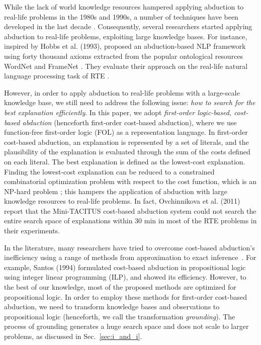 \documentclass[english]{jnlp_1.4}
\begin{document}
While the lack of world knowledge resources hampered applying
abduction to real-life problems in the 1980s and 1990s, a number of
techniques have been developed
in the last decade
\cite{fellbaum98,Chambers09,framenetII,Scho10,Hovy11}.
Consequently, several researchers started applying abduction to
real-life problems, exploiting large knowledge bases. For instance,
inspired by Hobbs et al. (1993)\nocite{Hobbs93}, 
     proposed an abduction-based NLP framework using forty
thousand axioms extracted from the popular ontological resources WordNet \cite{fellbaum98} and
FrameNet \cite{framenetII}. They evaluate their approach on the
real-life natural language processing task of RTE \cite{Dagan10}.

However, in order to apply abduction to real-life problems with
a large-scale knowledge base, we still need to address the following
issue: \emph{how to search for the best explanation efficiently}. In
this paper, we adopt \emph{first-order logic-based, cost-based
  abduction} (henceforth first-order cost-based abduction), where we
use function-free first-order logic (FOL) as a representation
language. In first-order cost-based abduction, an explanation is
represented by a set of literals, and the plausibility of the explanation
is evaluated through the sum of the costs defined on each literal. The
best explanation is defined as the lowest-cost explanation. Finding
the lowest-cost explanation can be reduced to a constrained
combinatorial optimization problem with respect to the cost function,
which is an NP-hard problem \cite{Charniak91}; this hampers the
application of abduction with large knowledge resources to real-life
problems. In fact, Ovchinnikova et al. (2011) \nocite{Ovch11} report
that the Mini-TACITUS cost-based abduction system \cite{Mulkar07}
could not search the entire search space of explanations within 30
min in most of the RTE problems in their experiments.

In the
literature, many researchers have tried to overcome cost-based
abduction's inefficiency using a range of methods from approximation to
exact
inference~\cite{Poole93b,Santos94,Ishizuka98,Chivers07}. For
example, Santos (1994) formulated cost-based abduction in propositional
logic using integer linear programming (ILP), and showed its
efficiency. However, to the best of our knowledge, most of the
proposed methods are optimized for propositional logic. In order to
employ these methods for first-order cost-based abduction, we need to
transform knowledge bases and observations to propositional logic
(henceforth, we call the transformation \emph{grounding}). The process
of grounding generates a huge search space and does not scale
to larger problems, as discussed in Sec.~\ref{sec:i_and_i}.
\end{document}
